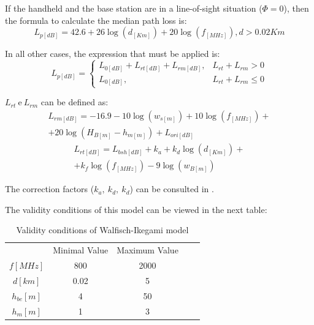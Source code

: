 \documentclass[letterpaper, 10 pt, conference]{ieeeconf}  %
\begin{document}
If the handheld and the base station are in a line-of-sight situation ($\Phi=0$), then the formula to calculate the median path loss is:
\begin{equation}
    L_{p[dB]}=42.6+26\log(d_{[Km]})+20\log(f_{[MHz]}),d>0.02Km
\end{equation}\par\noindent
In all other cases, the expression that must be applied is:
\begin{equation}
    L_{p[dB]}=
        \begin{cases}
        L_{0[dB]}+L_{rt[dB]}+L_{rm[dB]}, & \text{$L_{rt}+L_{rm}>0$}\\
        L_{0[dB]}, &\text{$L_{rt}+L_{rm}\leq0$}
        \end{cases}
\end{equation}\par\noindent
$L_{rt}\ \textrm{e}\  L_{rm}$ can be defined as:
\begin{equation}\label{equation:walfisch_ikegami_lrm}
\begin{split}
    L_{rm[dB]}=-16.9-10\log(w_{s[m]})+10\log(f_{[MHz]})+\\+20\log(H_{B[m]}-h_{m[m]})+L_{ori[dB]}
\end{split}
\end{equation}
\begin{equation}
\begin{split}
    L_{rt[dB]}=L_{bsh[dB]}+k_a+k_d\log(d_{[Km]})+\\+k_f\log(f_{[MHz]})-9\log(w_{B[m]})
\end{split}
\end{equation}\par\noindent
The correction factors ($k_a,\ k_d, \ k_d$) can be consulted in \cite{c1}.\par\noindent
The validity conditions of this model can be viewed in the next table:
\begin{table}[h]
\centering
\begin{tabular}{|c|c|c|ll}
\cline{1-3}
            & Minimal Value & Maximum Value &  &  \\ \cline{1-3}
$f [MHz] $  & 800             & 2000            &  &  \\ \cline{1-3}
$d [km]$    & 0.02               & 5              &  &  \\ \cline{1-3}
$h_{be}[m]$ & 4              & 50             &  &  \\ \cline{1-3}
$h_m [m]$   & 1               & 3              &  &  \\ \cline{1-3}
\end{tabular}
\caption{Validity conditions of Walfisch-Ikegami model}
\label{tab:validade_walsfisch-ikegami}
\end{table}
\end{document}
